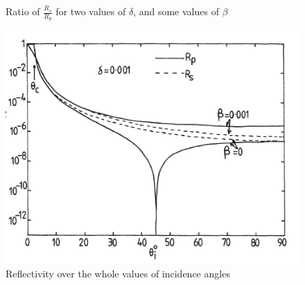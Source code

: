 \begin{figure}[]
%
\centering
%
\quad
%
%
\caption{Ratio of $\frac{R_s}{R_p}$ for two values of $\delta $, and some values of $\beta $}
\label{fig :R_s}
%
\end{figure}
\begin{figure}[]
%
\centering
%
\includegraphics[width=.6\textwidth]{Immagini/Chapter1/R_tot}
%
\caption{Reflectivity over the whole values of incidence angles}
%
\label{fig: Rtot}
%
\end{figure}
